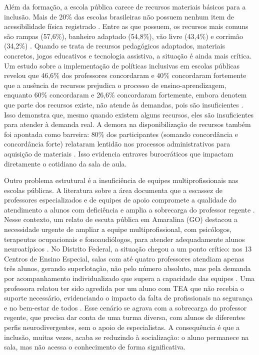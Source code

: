 Além da formação, a escola pública carece de recursos materiais básicos para a inclusão. Mais de 20\% das escolas brasileiras não possuem nenhum item de acessibilidade física registrado \cite{irm2026panorama}. Entre as que possuem, os recursos mais comuns são rampas (57,6\%), banheiro adaptado (54,8\%), vão livre (43,4\%) e corrimão (34,2\%) \cite{irm2026panorama}. Quando se trata de recursos pedagógicos adaptados, materiais concretos, jogos educativos e tecnologia assistiva, a situação é ainda mais crítica. Um estudo sobre a implementação de políticas inclusivas em escolas públicas revelou que 46,6\% dos professores concordaram e 40\% concordaram fortemente que a ausência de recursos prejudica o processo de ensino-aprendizagem, enquanto 60\% concordaram e 26,6\% concordaram fortemente, embora denotem que parte dos recursos existe, não atende às demandas, pois são insuficientes \cite{cunha2025recursos}. Isso demonstra que, mesmo quando existem alguns recursos, eles são insuficientes para atender à demanda real. A demora na disponibilização de recursos também foi apontada como barreira: 80\% dos participantes (somando concordância e concordância forte) relataram lentidão nos processos administrativos para aquisição de materiais \cite{cunha2025recursos}. Isso evidencia entraves burocráticos que impactam diretamente o cotidiano da sala de aula.

Outro problema estrutural é a insuficiência de equipes multiprofissionais nas escolas públicas. A literatura sobre a área documenta que a escassez de professores especializados e de equipes de apoio compromete a qualidade do atendimento a alunos com deficiência e amplia a sobrecarga do professor regente \cite{billingsley2019attrition,brunsting2026burnout,amorim2023escassez}. Nesse contexto, um relato de escuta pública em Amaralina (GO) destacou a necessidade urgente de ampliar a equipe multiprofissional, com psicólogos, terapeutas ocupacionais e fonoaudiólogos, para atender adequadamente alunos neuroatípicos \cite{mpeduc2025}. No Distrito Federal, a situação chegou a um ponto crítico: nos 13 Centros de Ensino Especial, salas com até quatro professores atendiam apenas três alunos, gerando superlotação, não pelo número absoluto, mas pela demanda por acompanhamento individualizado que supera a capacidade das equipes \cite{forum2026df}. Uma professora relatou ter sido agredida por um aluno com TEA que não recebia o suporte necessário, evidenciando o impacto da falta de profissionais na segurança e no bem-estar de todos \cite{forum2026df}. Esse cenário se agrava com a sobrecarga do professor regente, que precisa dar conta de uma turma diversa, com alunos de diferentes perfis neurodivergentes, sem o apoio de especialistas. A consequência é que a inclusão, muitas vezes, acaba se reduzindo à socialização: o aluno permanece na sala, mas não acessa o conhecimento de forma significativa.


